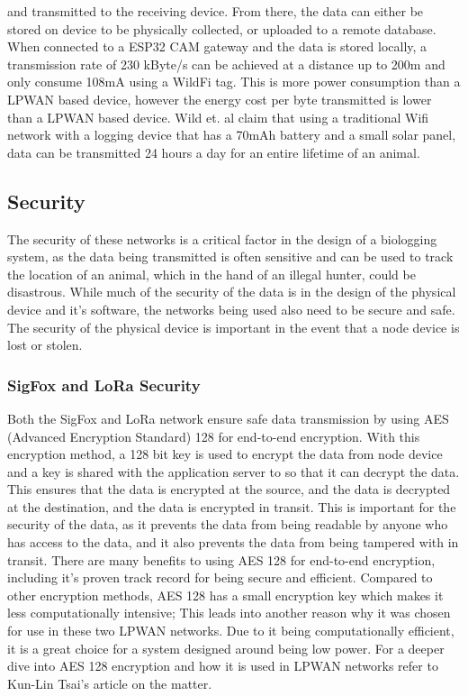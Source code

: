 \documentclass[sigplan,screen,nonacm]{acmart}
\begin{document}
and transmitted to the receiving device. From there, the data can either be stored on device 
to be physically collected, or uploaded to a remote database. When connected to a ESP32 CAM 
gateway and the data is stored locally, a transmission rate of 230 kByte/s can be achieved at 
a distance up to 200m and only consume 108mA using a WildFi tag\cite{wild2023internet}. This 
is more power consumption than a LPWAN based device, however the energy cost per byte 
transmitted is lower than a LPWAN based device. Wild et. al claim that using a traditional 
Wifi network with a logging device that has a 70mAh battery and a small solar panel, data can 
be transmitted 24 hours a day for an entire lifetime of an animal\cite{wild2023internet}.

\subsection{Security}
\label{subsec:Security}

The security of these networks is a critical factor in the design of a biologging system, as 
the data being transmitted is often sensitive and can be used to track the location of an animal, 
which in the hand of an illegal hunter, could be disastrous. While much of the security of the 
data is in the design of the physical device and it's software, the networks being used also need to 
be secure and safe. The security of the physical device is important in the event that a node 
device is lost or stolen.

\subsubsection{SigFox and LoRa Security}
\label{subsec:SigFox and LoRa Security}

Both the SigFox and LoRa network ensure safe data transmission by using AES (Advanced Encryption Standard) 
128 for end-to-end encryption. With this encryption method, a 128 bit key is used to encrypt the data from 
node device and a key is shared with the application server to so that it can decrypt the data\cite{AES128IoT}. 
This ensures that the data is encrypted at the source, and the data is decrypted at the destination, and 
the data is encrypted in transit. This is important for the security of the data, as it prevents the data 
from being readable by anyone who has access to the data, and it also prevents the data from being 
tampered with in transit. There are many benefits to using AES 128 for end-to-end encryption, including 
it's proven track record for being secure and efficient. Compared to other encryption methods, AES 128 
has a small encryption key which makes it less computationally intensive; This leads into another reason why 
it was chosen for use in these two LPWAN networks. Due to it being computationally efficient, it is 
a great choice for a system designed around being low power. For a deeper dive into AES 128 encryption and 
how it is used in LPWAN networks refer to Kun-Lin Tsai's article on the matter\cite{AES128IoT}.
\end{document}
